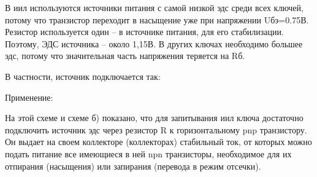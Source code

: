 В иил используются источники питания с самой низкой эдс среди всех ключей, потому что транзистор переходит в насыщение уже при напряжении Uбэ=0.75В. Резистор используется один -- в источнике питания, для его стабилизации. Поэтому, ЭДС источника -- около 1,15В. В других ключах необходимо большее эдс, потому что значительная часть напряжения теряется на Rб.

В частности, источник подключается так:

\begin{center}
	\begin{figure}[h!]
		\caption{}	
		\label{iil5}
	\end{figure}
\end{center}



Применение:
\begin{center}
	\begin{figure}[h!]
		\caption{}	
		\label{iil7}
	\end{figure}
\end{center}

На этой схеме и схеме б) показано, что для запитывания иил ключа достаточно подключить источник эдс через резистор R к горизонтальному pnp транзистору. Он выдает на своем коллекторе (коллекторах) стабильный ток, от которых можно подать питание все имеющиеся в ней npn транзисторы, необходимое для их отпирания (насыщения) или запирания (перевода в режим отсечки).
